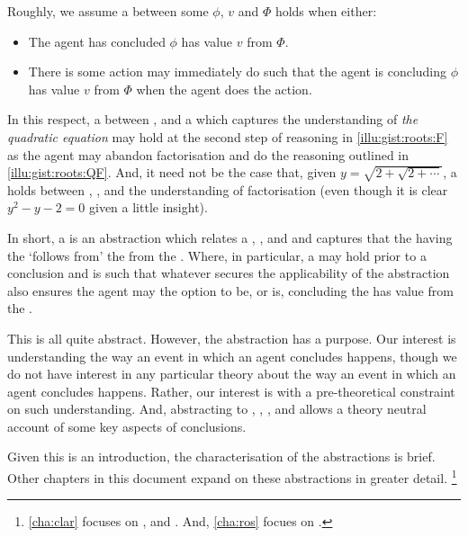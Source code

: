 \begin{note}
  Roughly, we assume a \ros{} between some  \(\phi\),  \(v\) and  \(\Phi\) holds when either:
  \begin{itemize}
  \item
    The agent has concluded \(\phi\) has value \(v\) from \(\Phi\).
  \item
    There is some action may immediately do such that the agent is concluding \(\phi\) has value \(v\) from \(\Phi\) when the agent does the action.
  \end{itemize}
  In this respect, a \ros{} between \propM{\rootsCon{}},  and a \pool{} which captures the \agents{} understanding of \emph{the quadratic equation} may hold at the second step of reasoning in \autoref{illu:gist:roots:F} as the agent may abandon factorisation and do the reasoning outlined in \autoref{illu:gist:roots:QF}.
  And, it need not be the case that, given \(y = \sqrt{ 2 + \sqrt{2 + \cdots}}\), a \ros{} holds between , , and the \agents{} understanding of factorisation (even though it is clear \(y^{2} - y - 2 = 0\) given a little insight).
\end{note}


\begin{note}
  In short, a \ros{} is an abstraction which relates a , , and  and captures that the \prop{} having the \val{} `follows from' the \pool{} from the \agpe{}.
  Where, in particular, a \ros{} may hold prior to a conclusion and is such that whatever secures the applicability of the abstraction also ensures the agent may the option to be, or is, concluding the  has value  from the .

  This is all quite abstract.
  However, the abstraction has a purpose.
  Our interest is understanding the way an event in which an agent concludes happens, though we do not have interest in any particular theory about the way an event in which an agent concludes happens.
  Rather, our interest is with a pre-theoretical constraint on such understanding.
  And, abstracting to , , , and  allows a theory neutral account of some key aspects of conclusions.

  Given this is an introduction, the characterisation of the abstractions is brief.
  Other chapters in this document expand on these abstractions in greater detail.%
  \footnote{
    \autoref{cha:clar} focuses on ,  and .
    And, \autoref{cha:ros} focues on .
  }
\end{note}



